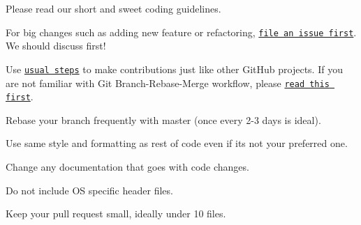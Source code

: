 
\begin{DoxyItemize}
\item Please read our short and sweet coding guidelines.
\item For big changes such as adding new feature or refactoring, \href{https://github.com/Hyperion-Software/issues}{\tt file an issue first}. We should discuss first!
\item Use \href{https://akrabat.com/the-beginners-guide-to-contributing-to-a-github-project/}{\tt usual steps} to make contributions just like other Git\+Hub projects. If you are not familiar with Git Branch-\/\+Rebase-\/\+Merge workflow, please \href{http://shitalshah.com/p/git-workflow-branch-rebase-squash-merge/}{\tt read this first}.
\end{DoxyItemize}


\begin{DoxyItemize}
\item Rebase your branch frequently with master (once every 2-\/3 days is ideal).
\item Use same style and formatting as rest of code even if it\textquotesingle{}s not your preferred one.
\item Change any documentation that goes with code changes.
\item Do not include OS specific header files.
\item Keep your pull request small, ideally under 10 files. 
\end{DoxyItemize}